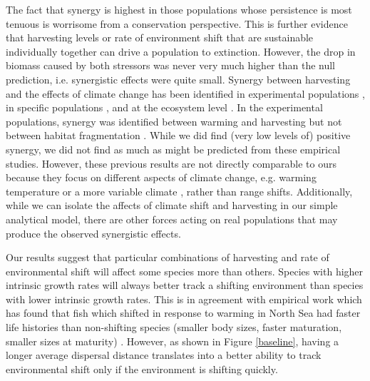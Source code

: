 \documentclass[12pt,english]{article}
\begin{document}
\begin{spacing}{1.9}
\begin{flushleft}
The fact that synergy is highest in those populations whose persistence is most tenuous is worrisome from a conservation perspective.  This is further evidence that harvesting levels or rate of environment shift that are sustainable individually together can drive a population to extinction.  However, the drop in biomass caused by both stressors was never very much higher than the null prediction, i.e. synergistic effects were quite small.  Synergy between harvesting and the effects of climate change has been identified in experimental populations \citep{Moraetal2007}, in specific populations \citep{Planque:2010uq}, and at the ecosystem level \citep{Kirby:2009fk,Planque:2010uq}.   In the experimental populations, synergy was identified between warming and harvesting but not between habitat fragmentation \citep{Moraetal2007}.    While we did find (very low levels of) positive synergy, we did not find as much as might be predicted from these empirical studies.  However, these previous results are not directly comparable to ours because they focus on different aspects of climate change, e.g. warming temperature \citep{Moraetal2007,Kirby:2009fk} or a more variable climate \citep{Planque:2010uq}, rather than range shifts.  Additionally, while we can isolate the affects of climate shift and harvesting in our simple analytical model, there are other forces acting on real populations that may produce the observed synergistic effects.

Our results suggest that particular combinations of harvesting and rate of environmental shift will affect some species more than others. Species with higher intrinsic growth rates will always better track a shifting environment than species with lower intrinsic growth rates.  This is in agreement with empirical work which has found that fish which shifted in response to warming in North Sea had faster life histories than non-shifting species (smaller body sizes, faster maturation, smaller sizes at maturity) \citep{Perryetal2005}.  However, as shown in Figure \ref{baseline}, having a longer average dispersal distance translates into a better ability to track environmental shift only if the environment is shifting quickly.   


\end{flushleft}
\end{spacing}
\end{document}
